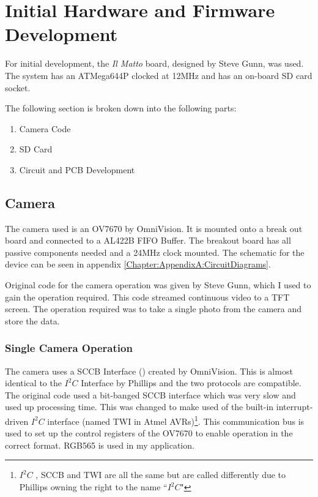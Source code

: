 \chapter{Initial Hardware and Firmware Development} \label{Chapter:HardwareDevelopment}
For initial development, the \textit{Il Matto} board, designed by Steve Gunn, was used. The system has an ATMega644P clocked at 12MHz and has an on-board SD card socket. 

The following section is broken down into the following parts:
\begin{enumerate}
\item Camera Code
\item SD Card
\item Circuit and PCB Development
\end{enumerate}

\section{Camera} \label{Section:Camera}

The camera used is an OV7670 by OmniVision. It is mounted onto a break out board and connected to a AL422B FIFO Buffer. The breakout board has all passive components needed and a 24MHz clock mounted. The schematic for the device can be seen in appendix \ref{Chapter:AppendixA:CircuitDiagrams}.

Original code for the camera operation was given by Steve Gunn, which I used to gain the operation required. This code streamed continuous video to a TFT screen. The operation required was to take a single photo from the camera and store the data. 

\subsection{Single Camera Operation}

The camera uses a SCCB Interface (\cite{SCCB_Interface}) created by OmniVision. This is almost identical to the $I^{2}C$ Interface by Phillips and the two protocols are compatible. The original code used a bit-banged SCCB interface which was very slow and used up processing time. This was changed to make used of the built-in interrupt-driven $I^{2}C$ interface (named TWI in Atmel AVRs)\footnote{$I^{2}C$ , SCCB and TWI are all the same but are called differently due to Phillips owning the right to the name ``$I^{2}C$"}. This communication bus is used to set up the control registers of the OV7670 to enable operation in the correct format. RGB565 is used in my application.

